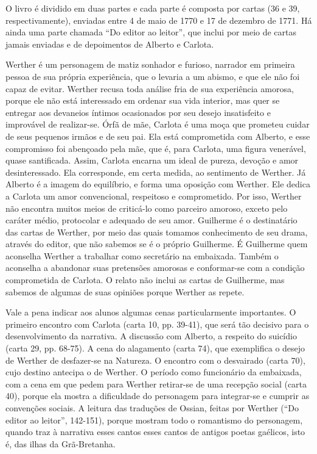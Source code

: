 \documentclass[11pt]{hedrabook}
\begin{document}
O livro é dividido em duas partes e cada parte é composta por cartas (36
e 39, respectivamente), enviadas entre 4 de maio de 1770 e 17 de
dezembro de 1771. Há ainda uma parte chamada “Do editor ao leitor”, que
inclui por meio de cartas jamais enviadas e de depoimentos de Alberto e
Carlota. 

Werther é um personagem de matiz sonhador e furioso, narrador em
primeira pessoa de sua própria experiência, que o levaria a um abismo,
e que ele não foi capaz de evitar. Werther recusa toda análise fria de
sua experiência amorosa, porque ele não está interessado em ordenar sua
vida interior, mas quer se entregar aos devaneios íntimos ocasionados
por seu desejo insatisfeito e improvável de realizar-se. Órfã de mãe,
Carlota é uma moça que prometeu cuidar de seus pequenos irmãos e de seu
pai. Ela está comprometida com Alberto, e esse compromisso foi
abençoado pela mãe, que é, para Carlota, uma figura venerável, quase
santificada. Assim, Carlota encarna um ideal de pureza, devoção e amor
desinteressado. Ela corresponde, em certa medida, ao sentimento de
Werther. Já Alberto é a imagem do equilíbrio, e forma uma oposição com
Werther. Ele dedica a Carlota um amor convencional, respeitoso e
comprometido. Por isso, Werther não encontra muitos meios de criticá-lo
como parceiro amoroso, exceto pelo caráter médio, protocolar e adequado
de seu amor. Guilherme é o destinatário das cartas de Werther, por meio
das quais tomamos conhecimento de seu drama, através do editor, que não
sabemos se é o próprio Guilherme. É Guilherme quem aconselha Werther a
trabalhar como secretário na embaixada. Também o aconselha a abandonar
suas pretensões amorosas e conformar-se com a condição comprometida de
Carlota. O relato não inclui as cartas de Guilherme, mas sabemos de
algumas de suas opiniões porque Werther as repete.

Vale a pena indicar aos alunos algumas cenas particularmente
importantes. O primeiro encontro com Carlota (carta 10, pp. 39-41), que
será tão decisivo para o desenvolvimento da narrativa. A discussão com
Alberto, a respeito do suicídio (carta 29, pp. 68-75). A cena do
alagamento (carta 74), que exemplifica o desejo de Werther de
desfazer-se na Natureza. O encontro com o desvairado (carta 70), cujo
destino antecipa o de Werther. O período como funcionário da embaixada,
com a cena em que pedem para Werther retirar-se de uma recepção social 
(carta 40), porque ela mostra a dificuldade do personagem para
integrar-se e cumprir as convenções sociais. A leitura das traduções de
Ossian, feitas por Werther (“Do editor ao leitor”, 142-151), porque
mostram todo o romantismo do personagem, quando traz à narrativa esses
cantos esses cantos de antigos poetas gaélicos, isto é, das ilhas da
Grã-Bretanha. 
\end{document}
